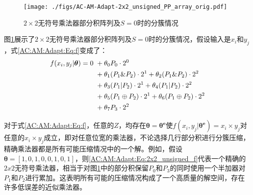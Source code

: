 \begin{figure}[!ht]
    \centering
    \texttt{[image: ./figs/AC-AM-Adapt-2x2\_unsigned\_PP\_array\_orig.pdf]}
    \caption{$2\times2$无符号乘法器部分积阵列及$S = 0$时的分簇情况}
    \label{AC:AM:Adapt:Fig:2x2_unsigned_PP_array_ori}
\end{figure}

图\ref{AC:AM:Adapt:Fig:2x2_unsigned_PP_array_ori}展示了$2\times2$无符号乘法器部分积阵列及$S = 0$时的分簇情况，假设输入是$x_i$和$y_j$，式\eqref{AC:AM:Adapt:Eq:f}变成了：
\begin{align}
      f(x_i, y_j \vert \boldsymbol{\theta}) = 0 
       &\ + \theta_0 P_0 \cdot 2^0 \notag \notag \\
       &\ + \theta_1 ( P_1 \& P_2 ) \cdot 2^1 + \theta_2 ( P_1 \& P_2 ) \cdot 2^2 \notag \\
       &\ + \theta_3 ( P_1 | P_2 ) \cdot 2^1 + \theta_4 ( P_1 | P_2 ) \cdot 2^2 \notag \\
       &\ + \theta_5 ( P_1 \oplus P_2 ) \cdot 2^1 + \theta_6 ( P_1 \oplus P_2 ) \cdot 2^2 \notag \\
       &\ +\theta_7 P_3 \cdot 2^2
       \label{AC:AM:Adapt:Eq:2x2_unsigned_f}
\end{align}

对于式\eqref{AC:AM:Adapt:Eq:f}，任意的$Z$，均存在$\boldsymbol{\theta} = \boldsymbol{{\theta}^{e}}$使$f(x_i, y_j \vert \boldsymbol{{\theta}^{e}}) =  x_i \times y_j$对任意的$x_i \times y_j$成立，即对任意位宽的乘法器，不论选择几行部分积进行分簇压缩，精确乘法器都是所有可能压缩情况中的一个解。例如，假设$\boldsymbol{\theta} = [1, 0, 1, 0, 0, 1, 0, 1]$，则\eqref{AC:AM:Adapt:Eq:2x2_unsigned_f}代表一个精确的$2x2$无符号乘法器，相当于对图\ref{AC:AM:Adapt:Fig:2x2_unsigned_PP_array_ori}中的部分积保留$P_0$和$P_3$的同时使用一个半加器对$P_1$和$P_2$进行累加。这表明所有可能的压缩情况构成了一个高质量的解空间，存在许多低误差的近似乘法器。

